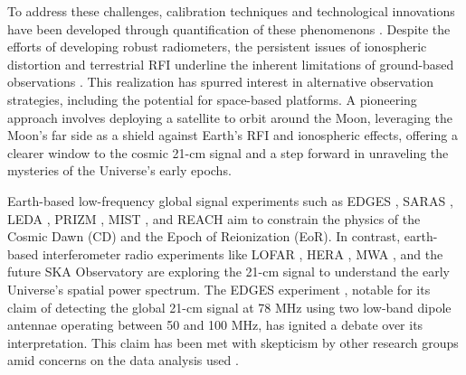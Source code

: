 \documentclass[fleqn,usenatbib]{rasti}
\begin{document}
To address these challenges, calibration techniques and technological innovations have been developed through quantification of these phenomenons \citep{Byrne2019, Shen2021}. Despite the efforts of developing robust radiometers, the persistent issues of ionospheric distortion and terrestrial RFI underline the inherent limitations of ground-based observations \citep{Datta2016, Offringa2013}. This realization has spurred interest in alternative observation strategies, including the potential for space-based platforms. A pioneering approach involves deploying a satellite to orbit around the Moon, leveraging the Moon's far side as a shield against Earth's RFI and ionospheric effects, offering a clearer window to the cosmic 21-cm signal and a step forward in unraveling the mysteries of the Universe's early epochs.

Earth-based low-frequency global signal experiments such as EDGES \citep{Bowman2008}, SARAS \citep{Singh2018}, LEDA \citep{Bernardi2016}, PRIZM \citep{Philip2019}, MIST \citep{Monsalve2023}, and REACH \citep{Acedo2022} aim to constrain the physics of the Cosmic Dawn (CD) and the Epoch of Reionization (EoR). In contrast, earth-based interferometer radio experiments like LOFAR \citep{Haarlem2013}, HERA \citep{DeBoer2017}, MWA \citep{Tingay2013}, and the future SKA Observatory \citep{ska2015} are exploring the 21-cm signal to understand the early Universe's spatial power spectrum. The EDGES experiment \citep{Bowman2008}, notable for its claim of detecting the global 21-cm signal at 78 MHz using two low-band dipole antennae operating between 50 and 100 MHz, has ignited a debate over its interpretation. This claim has been met with skepticism by other research groups amid concerns on the data analysis used \citep{hills2018, sims2019, bevins2022, singh2019}.
\end{document}
